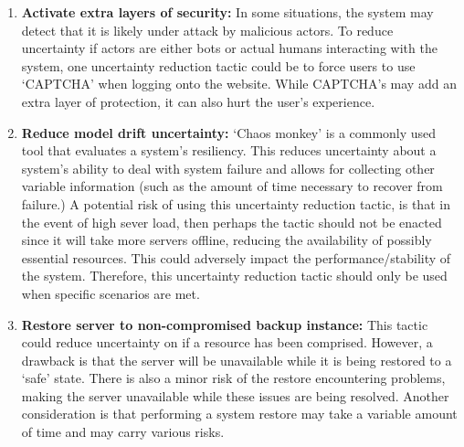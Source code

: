 \documentclass[12pt]{article}
\begin{document}
\begin{enumerate}[noitemsep]
    \item \textbf{Activate extra layers of security: }In some situations, the system may detect that it is likely under attack by malicious actors. To reduce uncertainty if actors are either bots or actual humans interacting with the system, one uncertainty reduction tactic could be to force users to use `CAPTCHA' when logging onto the website. While CAPTCHA's may add an extra layer of protection, it can also hurt the user's experience.

    \item \textbf{Reduce model drift uncertainty: }`Chaos monkey' is a commonly used tool that evaluates a system's resiliency. This reduces uncertainty about a system's ability to deal with system failure and allows for collecting other variable information (such as the amount of time necessary to recover from failure.) A potential risk of using this uncertainty reduction tactic, is that in the event of high sever load, then perhaps the tactic should not be enacted since it will take more servers offline, reducing the availability of possibly essential resources. This could adversely impact the performance/stability of the system. Therefore, this uncertainty reduction tactic should only be used when specific scenarios are met.

    \item \textbf{Restore server to non-compromised backup instance: }This tactic could reduce uncertainty on if a resource has been comprised. However, a drawback is that the server will be unavailable while it is being restored to a `safe' state. There is also a minor risk of the restore encountering problems, making the server unavailable while these issues are being resolved. Another consideration is that performing a system restore may take a variable amount of time and may carry various risks.
    
    

\end{enumerate}
 
\end{document}
